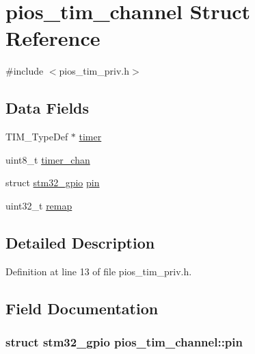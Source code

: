 \hypertarget{structpios__tim__channel}{\section{pios\-\_\-tim\-\_\-channel \-Struct \-Reference}
\label{structpios__tim__channel}
}


{\ttfamily \#include $<$pios\-\_\-tim\-\_\-priv.\-h$>$}

\subsection*{\-Data \-Fields}
\begin{DoxyCompactItemize}
\item 
\-T\-I\-M\-\_\-\-Type\-Def $\ast$ \hyperlink{structpios__tim__channel_a07d1ffb5da40643ef9938fa9c4fad017}{timer}
\item 
uint8\-\_\-t \hyperlink{structpios__tim__channel_a66cede40f7ef0785c0941c49ea162b59}{timer\-\_\-chan}
\item 
struct \hyperlink{structstm32__gpio}{stm32\-\_\-gpio} \hyperlink{structpios__tim__channel_a6500258c79aaab18cc524727753e388e}{pin}
\item 
uint32\-\_\-t \hyperlink{structpios__tim__channel_ac0c7199f77fa4e99068cda8572e02064}{remap}
\end{DoxyCompactItemize}


\subsection{\-Detailed \-Description}


\-Definition at line 13 of file pios\-\_\-tim\-\_\-priv.\-h.



\subsection{\-Field \-Documentation}
\hypertarget{structpios__tim__channel_a6500258c79aaab18cc524727753e388e}{
\subsubsection[{pin}]{\setlength{\rightskip}{0pt plus 5cm}struct {\bf stm32\-\_\-gpio} {\bf pios\-\_\-tim\-\_\-channel\-::pin}}}\label{structpios__tim__channel_a6500258c79aaab18cc524727753e388e}


